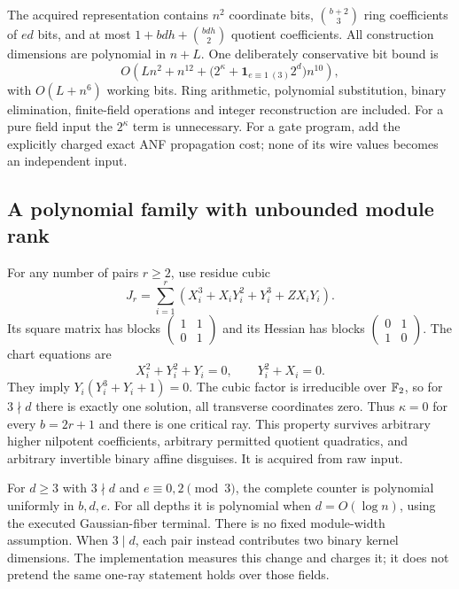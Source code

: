 The acquired representation contains $n^2$ coordinate bits,
$\binom{b+2}{3}$ ring coefficients of $ed$ bits, and at most
$1+bdh+\binom{bdh}{2}$ quotient coefficients. All construction dimensions
are polynomial in $n+L$. One deliberately conservative bit bound is
\[
 O\!\left(Ln^2+n^{12}+
  \bigl(2^\kappa+\mathbf1_{e\equiv1\ (3)}2^d\bigr)n^{10}\right),
\]
with $O(L+n^6)$ working bits. Ring arithmetic, polynomial substitution,
binary elimination, finite-field operations and integer reconstruction
are included. For a pure field input the $2^\kappa$ term is unnecessary.
For a gate program, add the explicitly charged exact ANF propagation cost;
none of its wire values becomes an independent input.

\subsection{A polynomial family with unbounded module rank}
For any number of pairs $r\ge2$, use residue cubic
\[
 J_r=\sum_{i=1}^r
 (X_i^3+X_iY_i^2+Y_i^3+ZX_iY_i).
\]
Its square matrix has blocks
$\left(\begin{smallmatrix}1&1\\0&1\end{smallmatrix}\right)$ and its
Hessian has blocks
$\left(\begin{smallmatrix}0&1\\1&0\end{smallmatrix}\right)$.
The chart equations are
\[
 X_i^2+Y_i^2+Y_i=0,\qquad Y_i^2+X_i=0.
\]
They imply $Y_i(Y_i^3+Y_i+1)=0$. The cubic factor is irreducible over
$\mathbb F_2$, so for $3\nmid d$ there is exactly one solution, all transverse
coordinates zero. Thus $\kappa=0$ for every $b=2r+1$ and there is one
critical ray. This property survives arbitrary higher nilpotent
coefficients, arbitrary permitted quotient quadratics, and arbitrary
invertible binary affine disguises. It is acquired from raw input.

For $d\ge3$ with $3\nmid d$ and $e\equiv0,2\pmod3$, the complete
counter is polynomial uniformly in $b,d,e$. For all depths it is
polynomial when $d=O(\log n)$, using the executed Gaussian-fiber terminal.
There is no fixed module-width assumption. When $3\mid d$, each pair
instead contributes two binary kernel dimensions. The implementation
measures this change and charges it; it does not pretend the same
one-ray statement holds over those fields.

